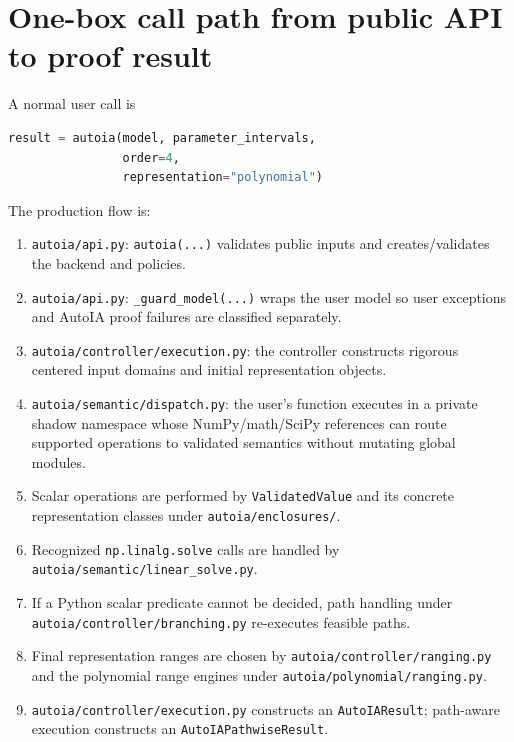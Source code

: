 \documentclass[11pt]{article}
\newcommand{\codepath}[1]{\nolinkurl{#1}}
\begin{document}
\section{One-box call path from public API to proof result}

A normal user call is
\begin{lstlisting}[language=Python]
result = autoia(model, parameter_intervals,
                order=4,
                representation="polynomial")
\end{lstlisting}
The production flow is:

\begin{enumerate}[leftmargin=*]
\item \codepath{autoia/api.py}: \texttt{autoia(...)} validates public inputs and
creates/validates the backend and policies.
\item \codepath{autoia/api.py}: \texttt{\_guard\_model(...)} wraps the user model
so user exceptions and AutoIA proof failures are classified separately.
\item \codepath{autoia/controller/execution.py}: the controller constructs
rigorous centered input domains and initial representation objects.
\item \codepath{autoia/semantic/dispatch.py}: the user's function executes in a
private shadow namespace whose NumPy/math/SciPy references can route supported
operations to validated semantics without mutating global modules.
\item Scalar operations are performed by \texttt{ValidatedValue} and its concrete
representation classes under \codepath{autoia/enclosures/}.
\item Recognized \texttt{np.linalg.solve} calls are handled by
\codepath{autoia/semantic/linear_solve.py}.
\item If a Python scalar predicate cannot be decided, path handling under
\codepath{autoia/controller/branching.py} re-executes feasible paths.
\item Final representation ranges are chosen by
\codepath{autoia/controller/ranging.py} and the polynomial range engines under
\codepath{autoia/polynomial/ranging.py}.
\item \codepath{autoia/controller/execution.py} constructs an
\texttt{AutoIAResult}; path-aware execution constructs an
\texttt{AutoIAPathwiseResult}.
\end{enumerate}
\end{document}
